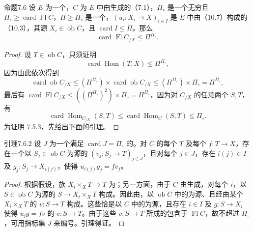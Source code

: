 \begin{SGAresult}{命题}{7.6}
设 $E$ 为一个，$C$ 为 $E$ 中由生成的（7.1），$\Pi_\circ$ 是一个无穷且 $\Pi_\circ\geq\operatorname{card}\operatorname{Fl}C$，$\Pi\geq\Pi_\circ$ 是一个，$(u_i:X_i\to X)_{i\in I}$ 是 $E$ 中由（10.7）构成的（10.3），其源 $X_i\in\operatorname{ob}C$，且 $\operatorname{card}I\leq\Pi$。那么
\[
\operatorname{card}\operatorname{Fl}C_{/X}\leq\Pi^{\Pi_\circ}.
\]
\end{SGAresult}
\begin{proof}
设 $T\in\operatorname{ob}C$，只须证明
\[
\operatorname{card}\operatorname{Hom}(T,X)\leq\Pi^{\Pi_\circ},\tag{7.6.1}
\]
因为由此依次得到
\[
\operatorname{card}\operatorname{ob}C_{/X}\leq
(\Pi^{\Pi_\circ})\times\operatorname{card}\operatorname{ob}C_{/X}
\leq(\Pi^{\Pi_\circ})\times\Pi_\circ=\Pi^{\Pi_\circ},
\]
最后有 $\operatorname{card}\operatorname{Fl}C_{/X}\leq((\Pi^{\Pi_\circ})^2)\times\Pi_\circ=\Pi^{\Pi_\circ}$，因为对 $C_{/X}$ 的任意两个 $S,T$，有
\[
\operatorname{card}\operatorname{Hom}_{C_{/X}}(S,T)
\leq\operatorname{card}\operatorname{Hom}_C(S,T)\leq\Pi_\circ.
\]
为证明 7.5.3，先给出下面的引理。
\end{proof}
\begin{SGAresult}{引理}{7.6.2}
设 $J$ 为一个满足 $\operatorname{card}J=\Pi_\circ$ 的。对 $C$ 的每个 $T$ 及每个 $f:T\to X$，存在一个以 $S_j\in\operatorname{ob}C$ 为源的 $(v_j:S_j\to T)_{j\in J}$，且对每个 $j\in J$，存在 $i(j)\in I$ 及 $g_j:S_j\to X_{i(j)}$，使得 $u_{i(j)}g_j=fv_j$。
\end{SGAresult}
\begin{proof}
根据假设，族 $X_i\times_XT\to T$ 为；另一方面，由于 $C$ 由生成，对每个 $i$，以 $S\in\operatorname{ob}C$ 为源的 $S\to X_i\times_XT$ 构成。因此由，以 $\operatorname{ob}C$ 中的为源、且经由某个 $X_i\times_XT$ 的 $v:S\to T$ 构成。这些恰是以 $C$ 中的为源，且存在 $i\in I$ 及 $g:S\to X_i$ 使得 $u_i g=fv$ 的 $v:S\to T$。由于这些 $v:S\to T$ 所成的包含于 $\operatorname{Fl}C$，故不超过 $\Pi_\circ$，可用指标集 $J$ 来编号。引理得证。
\end{proof}
